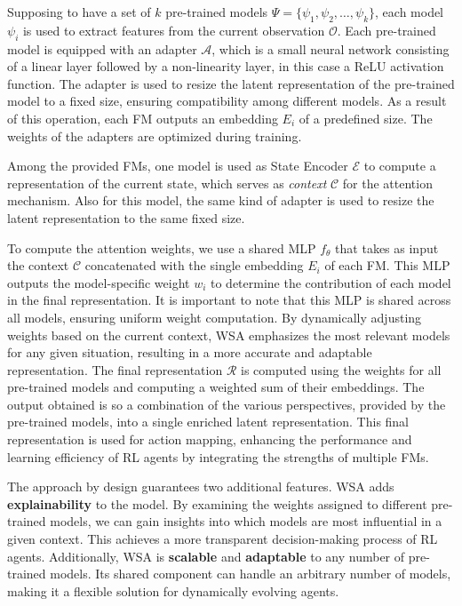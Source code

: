 Supposing to have a set of $k$ pre-trained models $\Psi = \{\psi_1, \psi_2, \ldots, \psi_k\}$, each model $\psi_i$ is used to extract features from the current observation $\mathcal{O}$.
Each pre-trained model is equipped with an adapter $\mathcal{A}$, which is a small neural network consisting of a linear layer followed by a non-linearity layer, in this case a ReLU activation function.
The adapter is used to resize the latent representation of the pre-trained model to a fixed size, ensuring compatibility among different models.
As a result of this operation, each FM outputs an embedding $E_i$ of a predefined size.
The weights of the adapters are optimized during training.

Among the provided FMs, one model is used as State Encoder $\mathcal{E}$ to compute a representation of the current state, which serves as \textit{context} $\mathcal{C}$ for the attention mechanism.
Also for this model, the same kind of adapter is used to resize the latent representation to the same fixed size.


To compute the attention weights, we use a shared MLP $f_\theta$ that takes as input the context $\mathcal{C}$ concatenated with the single embedding $E_i$ of each FM\@.
This MLP outputs the model-specific weight $w_i$ to determine the contribution of each model in the final representation.
It is important to note that this MLP is shared across all models, ensuring uniform weight computation.
By dynamically adjusting weights based on the current context, WSA emphasizes the most relevant models for any given situation, resulting in a more accurate and adaptable representation.
The final representation $\mathcal{R}$ is computed using the weights for all pre-trained models and computing a weighted sum of their embeddings.
The output obtained is so a combination of the various perspectives, provided by the pre-trained models, into a single enriched latent representation.
This final representation is used for action mapping, enhancing the performance and learning efficiency of RL agents by integrating the strengths of multiple FMs.


The approach by design guarantees two additional features.
WSA adds \textbf{explainability} to the model.
By examining the weights assigned to different pre-trained models, we can gain insights into which models are most influential in a given context.
This achieves a more transparent decision-making process of RL agents.
Additionally, WSA is \textbf{scalable} and \textbf{adaptable} to any number of pre-trained models.
Its shared component can handle an arbitrary number of models, making it a flexible solution for dynamically evolving agents.


